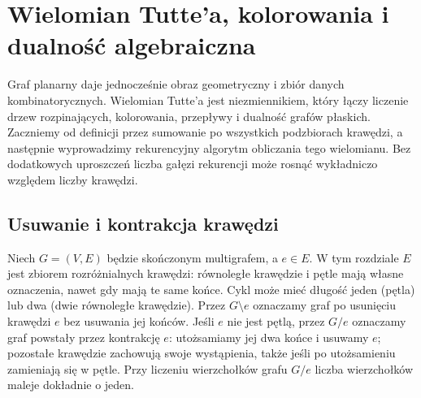 \chapter{Wielomian Tutte'a, kolorowania i dualność algebraiczna}
\label{ch:tg-tutte}

Graf planarny daje jednocześnie obraz geometryczny i zbiór danych
kombinatorycznych. Wielomian Tutte'a jest niezmiennikiem, który
łączy liczenie drzew rozpinających, kolorowania, przepływy
i dualność grafów płaskich. Zaczniemy od definicji przez
sumowanie po wszystkich podzbiorach krawędzi, a następnie
wyprowadzimy rekurencyjny algorytm obliczania tego wielomianu.
Bez dodatkowych uproszczeń liczba gałęzi rekurencji może
rosnąć wykładniczo względem liczby krawędzi.

\section{Usuwanie i kontrakcja krawędzi}
\label{sec:tg-deletion-contraction}

\begin{definicja}
Niech $G=(V,E)$ będzie skończonym multigrafem, a $e\in E$.
W tym rozdziale $E$ jest zbiorem rozróżnialnych krawędzi:
równoległe krawędzie i pętle mają własne oznaczenia,
nawet gdy mają te same końce. Cykl może mieć długość
jeden (pętla) lub dwa (dwie równoległe krawędzie).
Przez $G\setminus e$ oznaczamy graf po usunięciu krawędzi $e$
bez usuwania jej końców. Jeśli $e$ nie jest pętlą,
przez $G/e$ oznaczamy graf powstały przez kontrakcję $e$:
utożsamiamy jej dwa końce i usuwamy $e$; pozostałe krawędzie
zachowują swoje wystąpienia, także jeśli po utożsamieniu
zamieniają się w pętle. Przy liczeniu wierzchołków grafu $G/e$
liczba wierzchołków maleje dokładnie o jeden.
\end{definicja}

